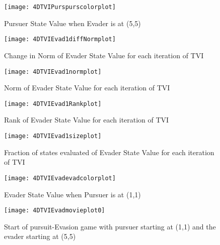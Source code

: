 \begin{figure}
\vspace{2.4in}
\centering
\texttt{[image: 4DTVIPurspurscolorplot]}
\caption{Pursuer State Value when Evader is at (5,5)}
\label{4DTVIPurspurscolorplot}
\end{figure}
\clearpage
\newpage

\begin{figure}
\vspace{2.4in}
\centering
\texttt{[image: 4DTVIEvad1diffNormplot]}
\caption{Change in Norm of Evader State Value for each iteration of TVI}
\label{4DTVIEvad1diffNormplot}
\end{figure}
\clearpage
\newpage

\begin{figure}
\vspace{2.4in}
\centering
\texttt{[image: 4DTVIEvad1normplot]}
\caption{Norm of Evader State Value for each iteration of TVI}
\label{4DTVIEvad1normplot}
\end{figure}
\clearpage
\newpage

\begin{figure}
\vspace{2.4in}
\centering
\texttt{[image: 4DTVIEvad1Rankplot]}
\caption{Rank of Evader State Value for each iteration of TVI}
\label{4DTVIEvad1Rankplot}
\end{figure}
\clearpage
\newpage

\begin{figure}
\vspace{2.4in}
\centering
\texttt{[image: 4DTVIEvad1sizeplot]}
\caption{Fraction of states evaluated of Evader State Value for each iteration of TVI}
\label{4DTVIEvad1sizeplot}
\end{figure}
\clearpage
\newpage

\begin{figure}
\vspace{2.4in}
\centering
\texttt{[image: 4DTVIEvadevadcolorplot]}
\caption{Evader State Value when Pursuer is at (1,1)}
\label{4DTVIEvadevadcolorplot}
\end{figure}
\clearpage
\newpage

\begin{figure}
\vspace{2.4in}
\centering
\texttt{[image: 4DTVIEvadmovieplot0]}
\caption{Start of pursuit-Evasion game with pursuer starting at (1,1) and the evader starting at (5,5)}
\label{4DTVIEvadmovieplot0}
\end{figure}
\clearpage
\newpage

